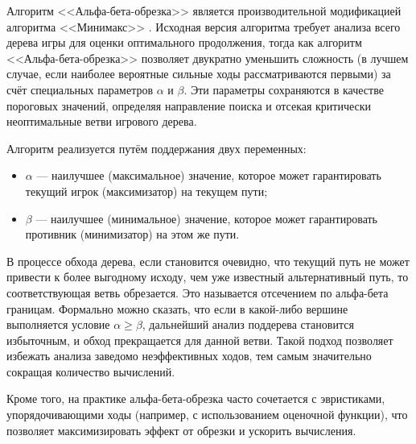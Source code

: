 Алгоритм <<Альфа-бета-обрезка>> является производительной модификацией алгоритма <<Минимакс>> \cite{alpha-beta-heuristic}. Исходная версия алгоритма требует анализа всего дерева игры для оценки оптимального продолжения, тогда как алгоритм <<Альфа-бета-обрезка>> позволяет двукратно уменьшить сложность (в лучшем случае, если наиболее вероятные сильные ходы рассматриваются первыми) за счёт специальных параметров $\alpha$ и $\beta$. Эти параметры сохраняются в качестве пороговых значений, определяя направление поиска и отсекая критически неоптимальные ветви игрового дерева.

Алгоритм реализуется путём поддержания двух переменных:
\begin{itemize}
    \item $\alpha$ --- наилучшее (максимальное) значение, которое может гарантировать текущий игрок (максимизатор) на текущем пути;
    \item $\beta$ --- наилучшее (минимальное) значение, которое может гарантировать противник (минимизатор) на этом же пути.
\end{itemize}

В процессе обхода дерева, если становится очевидно, что текущий путь не может привести к более выгодному исходу, чем уже известный альтернативный путь, то соответствующая ветвь обрезается. Это называется отсечением по альфа-бета границам. Формально можно сказать, что если в какой-либо вершине выполняется условие $\alpha \geq \beta$, дальнейший анализ поддерева становится избыточным, и обход прекращается для данной ветви. Такой подход позволяет избежать анализа заведомо неэффективных ходов, тем самым значительно сокращая количество вычислений.

Кроме того, на практике альфа-бета-обрезка часто сочетается с эвристиками, упорядочивающими ходы (например, с использованием оценочной функции), что позволяет максимизировать эффект от обрезки и ускорить вычисления.
